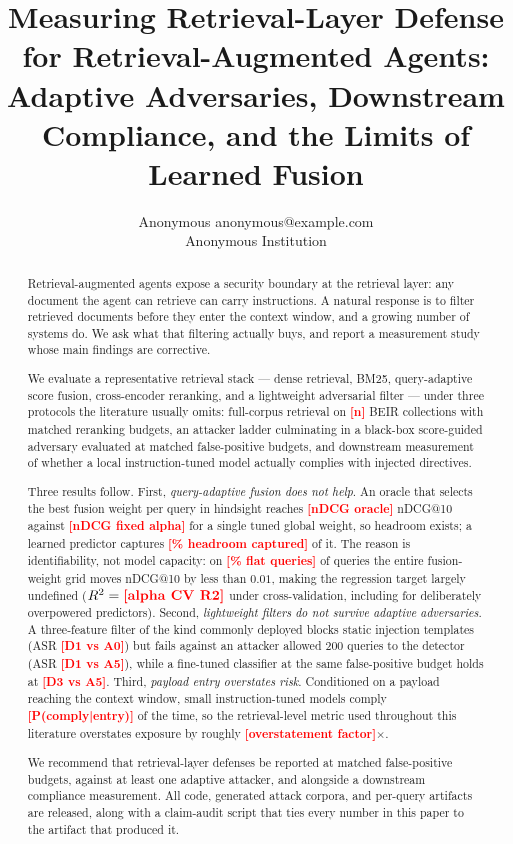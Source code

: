 \documentclass{article}
\title{Measuring Retrieval-Layer Defense for Retrieval-Augmented Agents:\\
Adaptive Adversaries, Downstream Compliance, and the Limits of Learned Fusion}
\author{\name Anonymous \email anonymous@example.com \\
        \addr Anonymous Institution}
\providecommand{\PENDING}[1]{\textcolor{red}{\textbf{[#1]}}}
\newcommand{\ndcgOracle}{\PENDING{nDCG oracle}}
\newcommand{\ndcgFixed}{\PENDING{nDCG fixed alpha}}
\newcommand{\headroomPct}{\PENDING{\% headroom captured}}
\newcommand{\flatFrac}{\PENDING{\% flat queries}}
\newcommand{\alphaRtwo}{\PENDING{alpha CV R2}}
\newcommand{\asrDoneStatic}{\PENDING{D1 vs A0}}
\newcommand{\asrDoneAdaptive}{\PENDING{D1 vs A5}}
\newcommand{\asrDthreeAdaptive}{\PENDING{D3 vs A5}}
\newcommand{\complianceRate}{\PENDING{P(comply|entry)}}
\newcommand{\overstatement}{\PENDING{overstatement factor}}
\newcommand{\nBeirCorpora}{\PENDING{n}}
\begin{document}
\maketitle

\begin{abstract}
Retrieval-augmented agents expose a security boundary at the retrieval layer:
any document the agent can retrieve can carry instructions. A natural response
is to filter retrieved documents before they enter the context window, and a
growing number of systems do. We ask what that filtering actually buys, and
report a measurement study whose main findings are corrective.

We evaluate a representative retrieval stack --- dense retrieval, BM25,
query-adaptive score fusion, cross-encoder reranking, and a lightweight
adversarial filter --- under three protocols the literature usually omits:
full-corpus retrieval on \nBeirCorpora{} BEIR collections with matched
reranking budgets, an attacker ladder culminating in a black-box score-guided
adversary evaluated at matched false-positive budgets, and downstream
measurement of whether a local instruction-tuned model actually complies with
injected directives.

Three results follow. First, \emph{query-adaptive fusion does not help}. An
oracle that selects the best fusion weight per query in hindsight reaches
\ndcgOracle{} nDCG@10 against \ndcgFixed{} for a single tuned global weight, so
headroom exists; a learned predictor captures \headroomPct{} of it. The reason
is identifiability, not model capacity: on \flatFrac{} of queries the entire
fusion-weight grid moves nDCG@10 by less than $0.01$, making the regression
target largely undefined ($R^2 = \alphaRtwo{}$ under cross-validation, including
for deliberately overpowered predictors). Second, \emph{lightweight filters do
not survive adaptive adversaries}. A three-feature filter of the kind commonly
deployed blocks static injection templates (ASR \asrDoneStatic{}) but fails
against an attacker allowed 200 queries to the detector (ASR
\asrDoneAdaptive{}), while a fine-tuned classifier at the same false-positive
budget holds at \asrDthreeAdaptive{}. Third, \emph{payload entry overstates
risk}. Conditioned on a payload reaching the context window, small
instruction-tuned models comply \complianceRate{} of the time, so the
retrieval-level metric used throughout this literature overstates exposure by
roughly \overstatement{}$\times$.

We recommend that retrieval-layer defenses be reported at matched
false-positive budgets, against at least one adaptive attacker, and alongside a
downstream compliance measurement. All code, generated attack corpora, and
per-query artifacts are released, along with a claim-audit script that ties
every number in this paper to the artifact that produced it.
\end{abstract}
\end{document}
